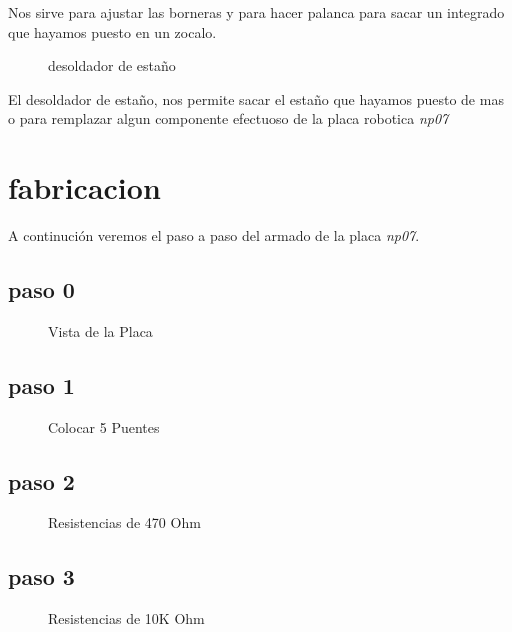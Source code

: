 \documentclass[letterpaper,10pt,english]{sphinxmanual}
\begin{document}
Nos sirve para ajustar las borneras y para hacer palanca para sacar un
integrado que hayamos puesto en un zocalo.
\newpage\begin{figure}[htbp]
\centering
\capstart

\noindent{}
\caption{desoldador de estaño}\label{np07:id5}\end{figure}

El desoldador de estaño, nos permite sacar el estaño que hayamos puesto
de mas o para remplazar algun componente efectuoso de la placa robotica \emph{np07}
\newpage

\section{fabricacion}
\label{np07:fabricacion}
A continución veremos el paso a paso del armado de la placa \emph{np07}.


\subsection{paso 0}
\label{np07:paso-0}\begin{figure}[htbp]
\centering
\capstart

\noindent{}
\caption{Vista de la Placa}\label{np07:id6}\end{figure}
\newpage

\subsection{paso 1}
\label{np07:paso-1}\begin{figure}[htbp]
\centering
\capstart

\noindent{}
\caption{Colocar 5 Puentes}\label{np07:id7}\end{figure}
\newpage

\subsection{paso 2}
\label{np07:paso-2}\begin{figure}[htbp]
\centering
\capstart

\noindent{}
\caption{Resistencias de 470 Ohm}\label{np07:id8}\end{figure}
\newpage

\subsection{paso 3}
\label{np07:paso-3}\begin{figure}[htbp]
\centering
\capstart

\noindent{}
\caption{Resistencias de 10K Ohm}\label{np07:id9}\end{figure}
\newpage
\end{document}
